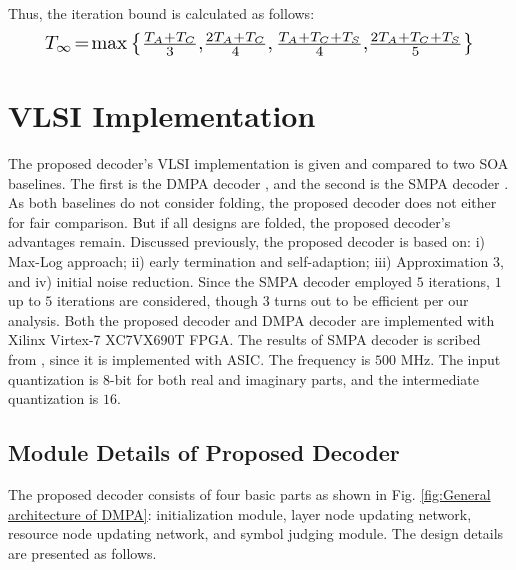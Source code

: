 \documentclass[journal,twoside]{IEEEtran}
\begin{document}
Thus, the iteration bound is calculated as follows:
\begin{equation}
\resizebox{.89\linewidth}{!}{$
T_{\infty}\!=\!
\max
\left\{
\begin{alignedat}{3}
&{\textstyle\frac{T_{A}+T_{C}}{3}},&&{\textstyle\frac{2T_{A}+T_{C}}{4}},{\textstyle\frac{T_{A}+T_{C}+T_{S}}{4}},&&{\textstyle\frac{2T_{A}+T_{C}+T_{S}}{5}}\\
\end{alignedat}
\right\}
$}
\end{equation}

%

\section{VLSI Implementation}\label{sec:VLSI}
The proposed decoder's VLSI implementation is given and compared to two SOA baselines. The first is the DMPA decoder \cite{SCMA_archi}, and the second is the SMPA decoder \cite{SMPA_2}. As both baselines do not consider folding, the proposed decoder does not either for fair comparison. But if all designs are folded, the proposed decoder's advantages remain. Discussed previously, the proposed decoder is based on: i) Max-Log approach; ii) early termination and self-adaption; iii) Approximation $3$, and iv) initial noise reduction. Since the SMPA decoder employed $5$ iterations, $1$ up to $5$ iterations are considered, though $3$ turns out to be efficient per our analysis. Both the proposed decoder and DMPA decoder are implemented with Xilinx Virtex-7 XC7VX690T FPGA. The results of SMPA decoder is scribed from \cite{SMPA_2}, since it is implemented with ASIC. The frequency is $500$ MHz. The input quantization is $8$-bit for both real and imaginary parts, and the intermediate quantization is $16$.

\subsection{Module Details of Proposed Decoder}\label{sec:sub:details}
The proposed decoder consists of four basic parts as shown in Fig. \ref{fig:General architecture of DMPA}: initialization module, layer node updating network, resource node updating network, and symbol judging module. The design details are presented as follows.
\end{document}
